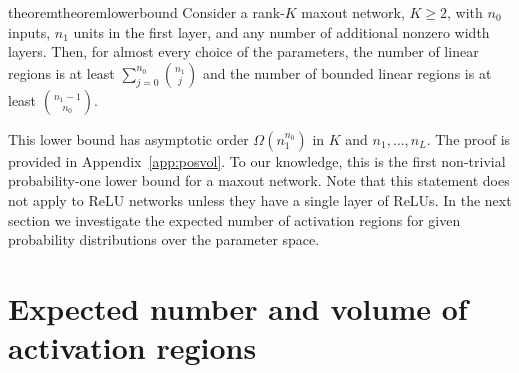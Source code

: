\documentclass{article}
\theoremstyle{definition}
\newcommand{\nin}{n_0}
\begin{document}
\begin{restatable}{theorem}{theoremlowerbound}
\label{thm:lower_bound}
Consider a rank-$K$ maxout network, $K\geq 2$, with $\nin$ inputs, $n_1$ units in the first layer, and any number of additional nonzero width layers. 
Then, for almost every choice of the parameters, the number of linear regions is at least $\sum_{j=0}^{\nin}{\binom{n_1}{j}}$ and the number of bounded linear regions is at least $\binom{n_1-1}{n_0}$.
\end{restatable}
This lower bound has asymptotic order $\Omega(n_1^{n_0})$ in $K$ and $n_1,\ldots, n_L$. 
The proof is provided in Appendix~\ref{app:posvol}.
To our knowledge, this is the first non-trivial probability-one lower bound for a maxout network. 
Note that this statement does not apply to ReLU networks unless they have a single layer of ReLUs.
In the next section we investigate the expected number of activation regions for given probability distributions over the parameter space.

\section{Expected number and volume of activation regions}
\label{section:number}
\end{document}
